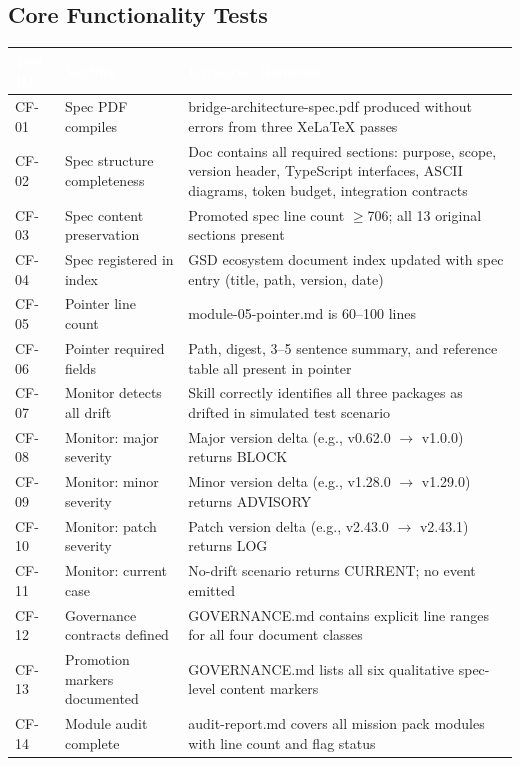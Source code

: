 \documentclass[11pt,letterpaper]{article}
\newcommand{\tableheader}[1]{\textbf{\sffamily\textcolor{white}{#1}}}
\begin{document}
\subsection{Core Functionality Tests}

\begin{center}
\begin{tabularx}{\textwidth}{L{1.5cm}L{4.5cm}X}
\toprule
{}
\tableheader{Test ID} & \tableheader{Verifies} & \tableheader{Expected Behavior} \\
\midrule
CF-01 & Spec PDF compiles & bridge-architecture-spec.pdf produced without errors from three XeLaTeX passes \\
CF-02 & Spec structure completeness & Doc contains all required sections: purpose, scope, version header, TypeScript interfaces, ASCII diagrams, token budget, integration contracts \\
CF-03 & Spec content preservation & Promoted spec line count $\geq$706; all 13 original sections present \\
CF-04 & Spec registered in index & GSD ecosystem document index updated with spec entry (title, path, version, date) \\
CF-05 & Pointer line count & module-05-pointer.md is 60--100 lines \\
CF-06 & Pointer required fields & Path, digest, 3--5 sentence summary, and reference table all present in pointer \\
CF-07 & Monitor detects all drift & Skill correctly identifies all three packages as drifted in simulated test scenario \\
CF-08 & Monitor: major severity & Major version delta (e.g., v0.62.0 $\rightarrow$ v1.0.0) returns BLOCK \\
CF-09 & Monitor: minor severity & Minor version delta (e.g., v1.28.0 $\rightarrow$ v1.29.0) returns ADVISORY \\
CF-10 & Monitor: patch severity & Patch version delta (e.g., v2.43.0 $\rightarrow$ v2.43.1) returns LOG \\
CF-11 & Monitor: current case & No-drift scenario returns CURRENT; no event emitted \\
CF-12 & Governance contracts defined & GOVERNANCE.md contains explicit line ranges for all four document classes \\
CF-13 & Promotion markers documented & GOVERNANCE.md lists all six qualitative spec-level content markers \\
CF-14 & Module audit complete & audit-report.md covers all mission pack modules with line count and flag status \\
\bottomrule
\end{tabularx}
\end{center}
\end{document}
